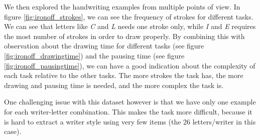 \par We then explored the handwriting examples from multiple points of view. In figure \ref{fig:ironoff_strokes}, we can see the frequency of strokes for different tasks. We can see that letters like \textit{C} and \textit{L} needs one stroke only, while \textit{I} and \textit{E} requires the most number of strokes in order to draw properly. By combining this with observation about the drawing time for different tasks (see figure \ref{fig:ironoff_drawingtime}) and the pausing time (see figure \ref{fig:ironoff_pausingtime}), we can have a good indication about the complexity of each task relative to the other tasks. The more strokes the task has, the more drawing and pausing time is needed, and the more complex the task is.

\par One challenging issue with this dataset however is that we have only one example for each writer-letter combination. This makes the task more difficult, because it is hard to extract a writer style using very few items (the 26 letters/writer in this case).

